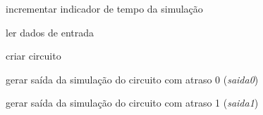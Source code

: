 \begin{algorithm}[h]
{{{                incrementar indicador de tempo da simulação

            }
            
        }
        
    }
            
    \BlankLine

    \BlankLine


    {    
        ler dados de entrada

        criar circuito

        \BlankLine
        

        gerar saída da simulação do circuito com atraso 0 (\textit{saida0}) 

        \BlankLine

        
        gerar saída da simulação do circuito com atraso 1 (\textit{saida1}) 
    } 

\end{algorithm}